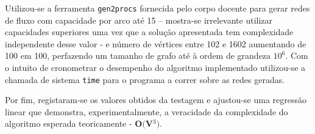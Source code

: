 \documentclass[12pt]{article}
\begin{document}
Utilizou-se a ferramenta \texttt{gen2procs} fornecida pelo corpo docente para gerar redes de fluxo com capacidade por arco até 15 – mostra-se irrelevante utilizar capacidades superiores uma vez que a solução apresentada tem complexidade independente desse valor - e número de vértices entre 102 e 1602 aumentando de 100 em 100, perfazendo um tamanho de grafo até à ordem de grandeza $10^6$. Com o intuito de cronometrar o desempenho do algoritmo implementado utilizou-se a chamada de sistema \texttt{time} para o programa a correr sobre as redes geradas.
\begin{center}
\end{center}

Por fim, registaram-se os valores obtidos da testagem e ajustou-se uma regressão linear que demonstra, experimentalmente, a veracidade da complexidade do algoritmo esperada teoricamente - $\textbf{O(V$^3$)}$.
\end{document}
